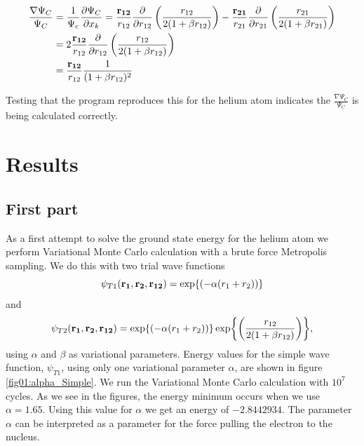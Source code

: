 \documentclass[11pt]{article}
\begin{document}
			\begin{align}
				\frac{\nabla\Psi_C}{\Psi_C} &= \frac{1}{\Psi_c} \pdv{\Psi_C}{x_k} = \frac{\vb{r_{12}}}{r_{12}}\pdv{}{r_{12}}\left( \frac{r_{12}}{2(1+\beta r_{12})} \right) - \frac{\vb{r_{21}}}{r_{21}}\pdv{}{r_{21}}\left( \frac{r_{21}}{2(1+\beta r_{21})} \right)
				\\
				&= 2\frac{\vb{r_{12}}}{r_{12}}\pdv{}{r_{12}}\left( \frac{r_{12}}{2(1+\beta r_{12})} \right)
				\\
				&= \frac{\vb{r_{12}}}{r_{12}} \frac{1}{(1+\beta r_{12})^2}
			\end{align}

			Testing that the program reproduces this for the helium atom indicates the \(\frac{\nabla \Psi_C}{\Psi_C}\) is being calculated correctly.

\section{Results}

\subsection{First part}

	As a first attempt to solve the ground state energy for the helium
	atom we perform Variational Monte Carlo calculation with a brute force
	Metropolis sampling. We do this with two trial wave functions
	\[
	\psi_{T1}({\bf r_{1}},{\bf r_{2}},{\bf r_{12}})=\exp{\left(-\alpha(r_{1}+r_{2})\right)}
	\]
	and
	\[
	\psi_{T2}({\bf r_{1}},{\bf r_{2}},{\bf r_{12}})=\exp{\left(-\alpha(r_{1}+r_{2})\right)}\exp{\left(\frac{r_{12}}{2(1+\beta r_{12})}\right)},
	\]
	using $\alpha$ and $\beta$ as variational parameters. Energy values
	for the simple wave function, $\psi_{T1}$, using only one variational
	parameter $\alpha$, are shown in figure \ref{fig01:alpha_Simple}.
	We run the Variational Monte Carlo calculation with $10^{7}$ cycles.
	As we see in the figures, the energy minimum occurs when we use $\alpha=1.65$.
	Using this value for $\alpha$ we get an energy of $-2.8442934$.
	The parameter $\alpha$ can be interpreted as a parameter for the
	force pulling the electron to the nucleus.
\end{document}
